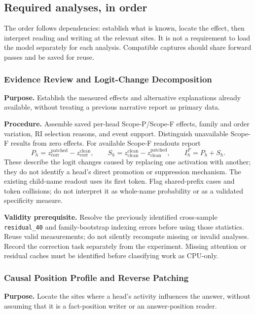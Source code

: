\documentclass[11pt,a4paper]{article}
\newcommand{\file}[1]{\nolinkurl{#1}}
\begin{document}
\subsection{Required analyses, in order}
The order follows dependencies: establish what is known, locate the effect,
then interpret reading and writing at the relevant sites. It is not a requirement
to load the model separately for each analysis. Compatible captures should share
forward passes and be saved for reuse.

\subsubsection*{Evidence Review and Logit-Change Decomposition}
\textbf{Purpose.} Establish the measured effects and alternative explanations
already available, without treating a previous narrative report as primary data.

\textbf{Procedure.} Assemble saved per-head Scope-P/Scope-F effects, family and
order variation, RI selection reasons, and event support. Distinguish unavailable
Scope-F results from zero effects. For available Scope-F readouts report
\[
P_h=z_{\mathrm{corr}}^{\mathrm{patched}}-z_{\mathrm{corr}}^{\mathrm{clean}},\qquad
S_h=z_{\mathrm{clean}}^{\mathrm{clean}}-z_{\mathrm{clean}}^{\mathrm{patched}},
\qquad I_h^F=P_h+S_h.
\]
These describe the logit changes caused by replacing one activation with another;
they do not identify a head's direct promotion or suppression mechanism.
The existing child-name readout uses its first token. Flag shared-prefix cases
and token collisions; do not interpret it as whole-name probability or as a
validated specificity measure.

\textbf{Validity prerequisite.} Resolve the previously identified cross-sample
\file{residual_40} and family-bootstrap indexing errors before using those
statistics. Reuse valid measurements; do not silently recompute missing or invalid
analyses. Record the correction task separately from the experiment. Missing
attention or residual caches must be identified before classifying work as CPU-only.

\subsubsection*{Causal Position Profile and Reverse Patching}
\textbf{Purpose.} Locate the sites where a head's activity influences the answer,
without assuming that it is a fact-position writer or an answer-position reader.
\end{document}
